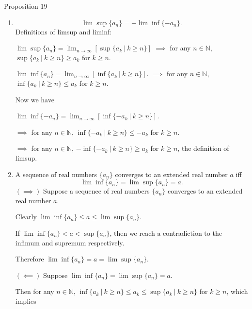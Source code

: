 \begin{flushleft}
\begin{namedthm*}{Proposition 19}
\begin{enumerate}[label=(\roman*),align=left]
	This implies that $\infty = \lim \sup \{a_n \}$ is a cluster point and there exists a subsequence that converges to infinity.
	Therefore $\{a_n \}$ is not bounded above.\par
	$(\impliedby)$ Suppose $\{a_n \}$ is not bounded above.\par
	By Proposition 4, $\{a_n \}$ does not converge to a real number.
	Also,$\{a_n \}$ is not bounded above implies that for any real number $c$, there exists an index such that $a_n > c$.
	Then the only upper bound of this sequence is $\infty$ and thus $\lim \sup \{a_n \}=\infty$.
	\item 
	\[
		\lim \sup \{a_n \}= -\lim \inf \{-a_n \}. 	
	\]
	Definitions of limsup and liminf:\par
	$\lim \sup \{a_n \} = \lim_{n \to \infty} [\sup \{ a_k\ |\ k \ge n\}]$
	$\implies$ for any $n \in \mathbb{N}$, $\sup \{ a_k\ |\ k \ge n\} \ge a_k$ for $k \ge n$.\par
	$\lim \inf \{a_n \} = \lim_{n \to \infty} [\inf \{ a_k\ |\ k \ge n\}]$.
	$\implies$ for any $n \in \mathbb{N}$, $\inf \{ a_k\ |\ k \ge n\} \le a_k$ for $k \ge n$.\par
	Now we have\par
	$\lim \inf \{-a_n \} = \lim_{n \to \infty} [\inf \{ -a_k\ |\ k \ge n\}]$.\par
	$\implies$ for any $n \in \mathbb{N}$, $\inf \{ -a_k\ |\ k \ge n\} \le -a_k$ for $k \ge n$.\par
	$\implies$ for any $n \in \mathbb{N}$, $-\inf \{ -a_k\ |\ k \ge n\} \ge a_k$ for $k \ge n$, the definition of limsup.\par
	\item A sequence of real numbers $\{ a_n\}$ converges to an extended real number $a$ iff 
	\[
		\lim \inf \{a_n \}= \lim \sup \{a_n \} = a.
	\]
	$(\implies)$ Suppose a sequence of real numbers $\{ a_n\}$ converges to an extended real number $a$.\par
	Clearly $\lim \inf \{a_n \} \le a \le \lim \sup \{a_n \} $.\par
	If $\lim \inf \{a_n \} < a < \sup \{a_n \} $, then we reach a contradiction to the infimum and supremum respectively.\par
	Therefore $\lim \inf \{a_n \} = a = \lim \sup \{a_n \} $.
	\par
	$(\impliedby)$ Suppose $\lim \inf \{a_n \}= \lim \sup \{a_n \} = a$.\par
	Then for any $n \in \mathbb{N}$, $\inf \{ a_k\ |\ k \ge n\} \le a_k \le \sup \{ a_k\ |\ k \ge n\}$ for $k \ge n$, which implies

\end{enumerate}
\end{namedthm*}
\end{flushleft}
